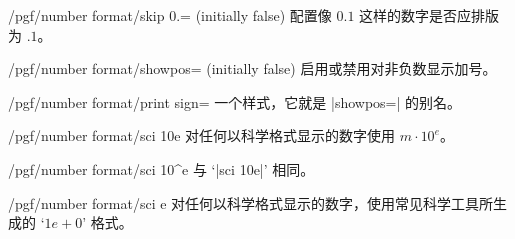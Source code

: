 \documentclass[a4paper,doc2]{ltxdoc}
\begin{document}
\begin{key}{/pgf/number format/skip 0.= (initially false)}
    配置像 $0.1$ 这样的数字是否应排版为 $.1$。
\begin{codeexample}[]
\end{codeexample}

\begin{codeexample}[]
\end{codeexample}
\end{key}

\begin{key}{/pgf/number format/showpos= (initially false)}
    启用或禁用对非负数显示加号。
\begin{codeexample}[]
\end{codeexample}

\begin{codeexample}[]
\end{codeexample}

\begin{codeexample}[]
\end{codeexample}
\end{key}

\begin{stylekey}{/pgf/number format/print sign=}
    一个样式，它就是 |showpos=| 的别名。
\end{stylekey}

\begin{key}{/pgf/number format/sci 10e}
    对任何以科学格式显示的数字使用 $m \cdot 10^e$。

\begin{codeexample}[]
\end{codeexample}
\end{key}

\begin{key}{/pgf/number format/sci 10\textasciicircum e}
    与 `|sci 10e|' 相同。
\end{key}

\begin{key}{/pgf/number format/sci e}
    对任何以科学格式显示的数字，使用常见科学工具所生成的 `$1e{+}0$' 格式。

\begin{codeexample}[]
\end{codeexample}
\end{key}
\end{document}

